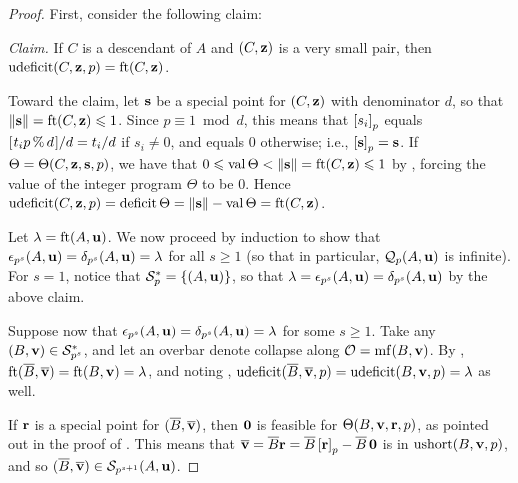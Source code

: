 \documentclass[11pt]{amsart}
\newcommand{\ushort}{\operatorname{ushort}}
\newcommand{\deficit}{\operatorname{deficit}}
\newcommand{\udeficit}{\operatorname{udeficit}}
\newcommand{\denom}{d}
\renewcommand{\S}{\mathcal{S}}
\begin{document}
\begin{proof}
First, consider the following claim:

\vspace{.2cm}

\noindent \emph{Claim.} If $C$ is a descendant of $A$ and $(C, \mathbf{z})$ is a very small pair, then $\udeficit(C, \vv{z}, p) = \ft{C}{\vv{z}}$.

\vspace{.2cm}

Toward the claim, let $\mathbf{s}$ be a special point for $(C, \mathbf{z})$ with denominator $\denom$, so that $\| \mathbf{s} \| = \operatorname{ft}(C, \mathbf{z}) \leqslant 1$. 
Since $p \equiv 1 \bmod \denom$, this means that $\left[ s_i \right]_p$ equals $[ \hspace{.01in} t_i p \, \% \, d \hspace{.01in} ]/d = t_i/d$ if $s_i \neq 0$, and equals $0$ otherwise; i.e.,
$\left[ \mathbf{s} \right]_p = \mathbf{s}$.
If  $\Theta = \Theta(C, \mathbf{z}, \mathbf{s}, p)$, we have that $0 \leqslant \operatorname{val} \Theta < \| \mathbf{s} \| = \operatorname{ft}(C, \mathbf{z}) \leqslant 1$  by , forcing the value of the integer program $\Theta$ to be $0$.  Hence $\udeficit(C, \vv{z}, p) = \deficit \Theta = \norm{\vv{s}} - \val\Theta = \ft{C}{\vv{z}}$.

Let $\lambda = \operatorname{ft}(A, \mathbf{u})$. We now proceed by induction to show that $\epsilon_{p^s}(A,\mathbf{u})  =  \delta_{p^s}(A,\mathbf{u}) = \lambda$ for all $s \geq 1$ (so that in particular, $\mathcal{Q}_p(A,\mathbf{u})$ is infinite).
For $s=1$, notice that $\S_p^\ast = \{ (A, \vv{u} ) \}$, so that 
$\lambda = \epsilon_{p^s}(A,\mathbf{u}) = \delta_{p^s}(A,\mathbf{u})$ by the above claim. 

Suppose now that $\epsilon_{p^s}(A,\mathbf{u})  =  \delta_{p^s}(A,\mathbf{u}) = \lambda$ for some $s \geq 1$.  Take any $(B, \vv{v}) \in \S_{p^s}^\ast$, and let an overbar denote collapse along $\mathcal{O} = \operatorname{mf}(B, \mathbf{v})$.
By , 
$\operatorname{ft}(\overline{B}, \overline{\mathbf{v}}) = \operatorname{ft}(B, \mathbf{v})  = \lambda$, and 
noting , $\udeficit(\overline{B}, \overline{\vv{v}}, p) = \udeficit(B, \vv{v}, p) = \lambda$ as well.

If $\mathbf{r}$ is a special point for $(\overline{B}, \overline{\mathbf{v}} )$, then $\mathbf{0}$ is feasible for $\Theta(B,\mathbf{v},\mathbf{r},p)$, as pointed out in the proof of .
This means that $\overline{\mathbf{v}} = \overline{B}\mathbf{r} = \overline{B}\left[ \mathbf{r} \right]_p - \overline{B} \, \mathbf{0}$ is in $\ushort(B, \vv{v}, p)$, and so $(\overline{B}, \overline{\vv{v}}) \in \S_{p^{s+1}}(A, \vv{u})$.


\end{proof}
\end{document}

